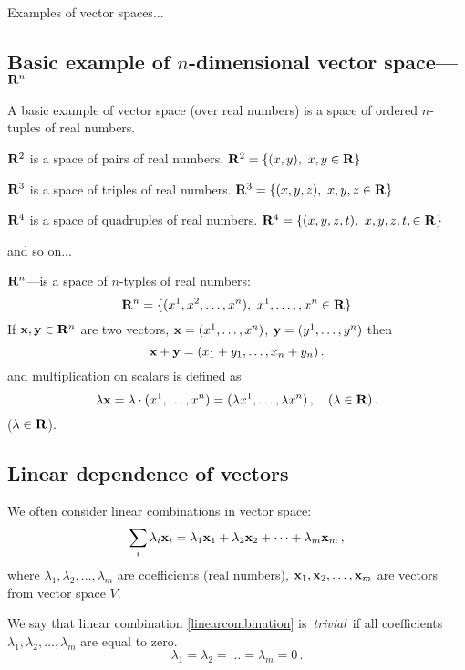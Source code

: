 \documentclass[12pt]{article}
\numberwithin{equation}{section}
\begin{document}
\m


 Examples of vector spaces...




\subsection {Basic example of $n$-dimensional vector space---${\bf R}^n$}

 A basic example of vector space (over real numbers) is a space
  of ordered $n$-tuples of real numbers.


\noindent  ${\bf R}^2$ is a space of pairs of real numbers. ${\bf R}^2=\{(x,y),\,\,x,y\in {\bf R} \}$

\noindent    ${\bf R}^3$ is a space of triples  of real numbers. ${\bf R}^3=\{(x,y,z),\,\,x,y,z\in {\bf R} \}$

\noindent    ${\bf R}^4$ is a space of quadruples  of real numbers. ${\bf R}^4=\{(x,y,z,t),\,\,x,y,z,t,\in {\bf R} \}$

  \centerline {and so on...}
  ${\bf R}^n$---is a space of $n$-typles of real numbers:
                    \begin{equation}\label{basisexampleofvectorspace}
         {\bf R}^n=\{(x^1,x^2,\dots,x^n),\,\,x^1,\dots,,x^n\in {\bf R} \}
                     \end{equation}
  If  ${\bf x},{\bf y}\in {\bf R}^n$ are two vectors, ${\bf x}=(x^1,\dots,x^n)$, ${\bf y}=(y^1,\dots,y^n)$
then             $$
        {\bf x}+{\bf y}=(x_1+y_1,\dots,x_n+y_n)\,.
                 $$ and
multiplication on scalars is defined as
           $$
\lambda{\bf x}=\lambda \cdot (x^1,\dots,x^n)=(\lambda x^1,\dots,\lambda x^n)\,,\quad (\lambda\in {\bf R})\,.
           $$
($\lambda\in {\bf R}$).


\subsection{Linear dependence of vectors}



We often consider linear combinations  in vector space:
           \begin{equation}\label{linearcombination}
            \sum_i\lambda_i{\bf x}_i=\lambda_1{\bf x}_1+\lambda_2{\bf x}_2+\dots+\lambda_m{\bf x}_m\,,
           \end{equation}
          where $\lambda_1,\lambda_2,\dots,\lambda_m$ are coefficients (real numbers),
          ${\bf x}_1,{\bf x}_2,\dots,{\bf x}_m$ are vectors from vector space $V$.

We say that linear combination \eqref{linearcombination} is {\it \,trivial\,} if all coefficients $\lambda_1,\lambda_2,\dots,\lambda_m$ are equal to zero.
              $$
               \lambda_1=\lambda_2=\dots=\lambda_m=0\,.
               $$
\end{document}
